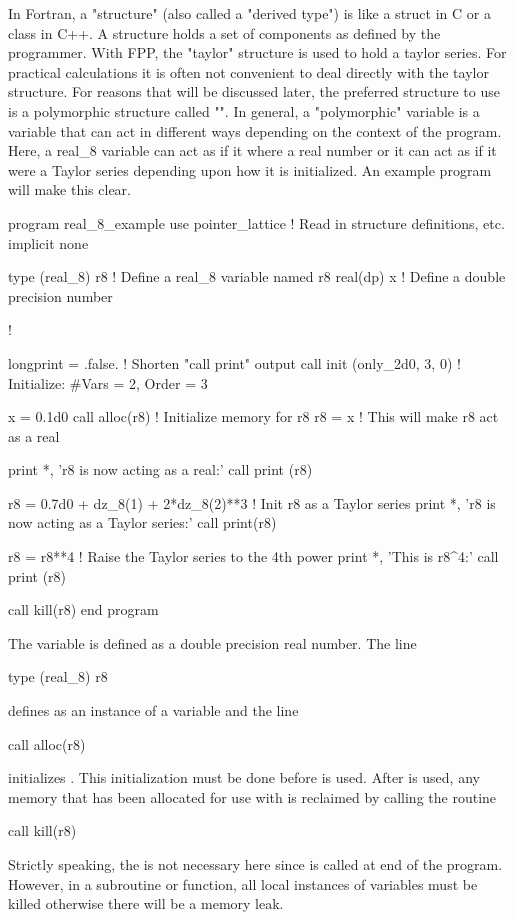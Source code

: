 \documentclass[english,12pt,article]{article} %
\begin{document}
In Fortran, a "structure" (also called a "derived type") is like a struct in C or a class in C++. A structure holds a set of components as defined by the programmer. With FPP, the "taylor" structure is used to hold a taylor series. For practical calculations it is often not convenient to deal directly with the taylor structure. For reasons that will be discussed later, the preferred structure to use is a polymorphic structure called "". In general, a "polymorphic" variable is a variable that can act in different ways depending on the context of the program. Here, a real_8 variable can act as if it where a real number or it can act as if it were a Taylor series depending upon how it is initialized.
An example program will make this clear.
\begin{code}
  program real_8_example
  use pointer_lattice   ! Read in structure definitions, etc.
  implicit none

  type (real_8) r8      ! Define a real_8 variable named r8
  real(dp) x            ! Define a double precision number

  !

  longprint = .false.         ! Shorten "call print" output
  call init (only_2d0, 3, 0)  ! Initialize: #Vars = 2, Order = 3

  x = 0.1d0
  call alloc(r8)          ! Initialize memory for r8
  r8 = x                  ! This will make r8 act as a real

  print *, 'r8 is now acting as a real:'
  call print (r8)

  r8 = 0.7d0 + dz_8(1) + 2*dz_8(2)**3 ! Init r8 as a Taylor series
  print *, 'r8 is now acting as a Taylor series:'
  call print(r8)

  r8 = r8**4  ! Raise the Taylor series to the 4th power
  print *, 'This is r8^4:'
  call print (r8)

  call kill(r8)
  end program
\end{code}

The variable  is defined as a double precision real number. The line
\begin{example}
  type (real_8) r8
\end{example}
defines  as an instance of a  variable and the line
\begin{example}
  call alloc(r8)
\end{example}
initializes . This initialization must be done before  is used. After  is used, any memory that has been allocated for use with  is reclaimed by calling the  routine
\begin{example}
  call kill(r8)
\end{example}
Strictly speaking, the  is not necessary here since  is called at end of the program. However, in a subroutine or function, all local instances of  variables must be killed otherwise there will be a memory leak.
\end{document}
